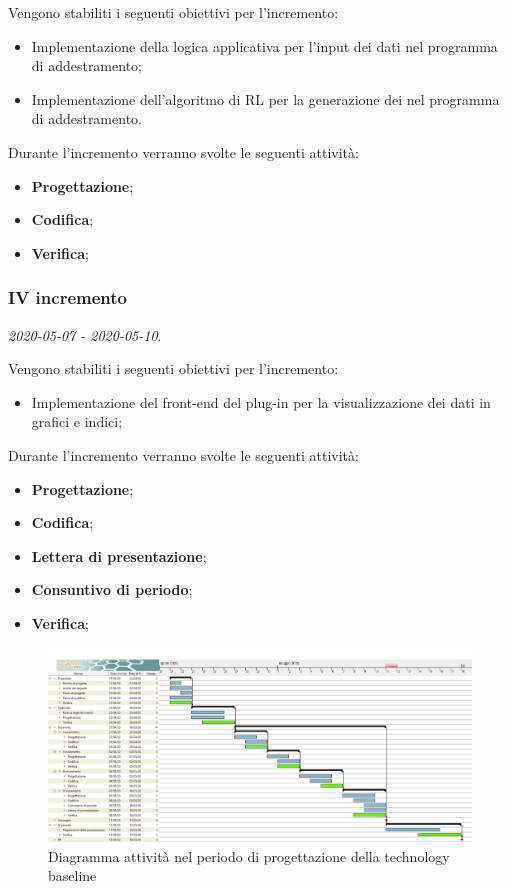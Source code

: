 \documentclass[../piano-di-progetto.tex]{subfiles}
\begin{document}
 Vengono stabiliti i seguenti obiettivi per l'incremento:
 \begin{itemize}
     \item Implementazione della logica applicativa per l'input dei dati nel programma di addestramento;
     \item Implementazione dell'algoritmo di RL per la generazione dei  nel programma di addestramento.
 \end{itemize}

Durante l'incremento verranno svolte le seguenti attività: 
\begin{itemize}
    \item \textbf{Progettazione};
    \item \textbf{Codifica};
    \item \textbf{Verifica};
\end{itemize}


\subsubsection{IV incremento}
\emph{2020-05-07 - 2020-05-10}. 
 
 Vengono stabiliti i seguenti obiettivi per l'incremento:
 \begin{itemize}
     \item Implementazione del front-end del plug-in per la visualizzazione dei dati in grafici e indici;
 \end{itemize}

Durante l'incremento verranno svolte le seguenti attività: 
\begin{itemize}
    \item \textbf{Progettazione};
    \item \textbf{Codifica};
    \item \textbf{Lettera di presentazione};
    \item \textbf{Consuntivo di periodo};
    \item \textbf{Verifica};
\end{itemize}



\newpage
\begin{landscape}
    \begin{figure}[H]
        \centering
        \includegraphics[width=24cm]{img/progettazione.png}
        \caption{Diagramma attività nel periodo di progettazione della technology baseline}
      \end{figure}
\end{landscape}
\end{document}
